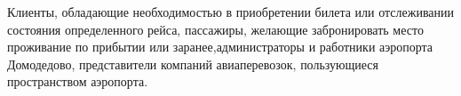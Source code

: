 Клиенты, обладающие необходимостью в приобретении билета или отслеживании состояния 
определенного рейса, пассажиры, желающие забронировать место проживание 
по прибытии или заранее,администраторы и работники аэропорта Домодедово, 
представители компаний авиаперевозок, пользующиеся пространством аэропорта.
